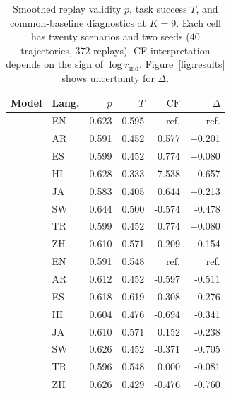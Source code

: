 \begin{table}[t]\centering\footnotesize
\setlength{\tabcolsep}{3pt}
\begin{tabular*}{\columnwidth}{@{\extracolsep{\fill}}llrrrr@{}}\toprule
Model & Lang. & $p$ & $T$ & $\mathrm{CF}$ & $\Delta$ \\ \midrule
{} & EN & 0.623 & 0.595 & ref. & ref. \\
 & AR & 0.591 & 0.452 & 0.577 & +0.201 \\
 & ES & 0.599 & 0.452 & 0.774 & +0.080 \\
 & HI & 0.628 & 0.333 & -7.538 & -0.657 \\
 & JA & 0.583 & 0.405 & 0.644 & +0.213 \\
 & SW & 0.644 & 0.500 & -0.574 & -0.478 \\
 & TR & 0.599 & 0.452 & 0.774 & +0.080 \\
 & ZH & 0.610 & 0.571 & 0.209 & +0.154 \\
\midrule
{} & EN & 0.591 & 0.548 & ref. & ref. \\
 & AR & 0.612 & 0.452 & -0.597 & -0.511 \\
 & ES & 0.618 & 0.619 & 0.308 & -0.276 \\
 & HI & 0.604 & 0.476 & -0.694 & -0.341 \\
 & JA & 0.610 & 0.571 & 0.152 & -0.238 \\
 & SW & 0.626 & 0.452 & -0.371 & -0.705 \\
 & TR & 0.596 & 0.548 & 0.000 & -0.081 \\
 & ZH & 0.626 & 0.429 & -0.476 & -0.760 \\
\bottomrule\end{tabular*}
\caption{Smoothed replay validity $p$, task success $T$, and common-baseline diagnostics at $K=9$. Each cell has twenty scenarios and two seeds ($40$ trajectories, $372$ replays). CF interpretation depends on the sign of $\log r_{\mathrm{ind}}$. Figure~\ref{fig:results} shows uncertainty for $\Delta$.}
\label{tab:cf}\end{table}
